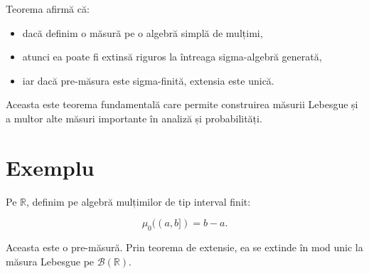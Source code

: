 \documentclass[12pt]{article}
\theoremstyle{plain}
\begin{document}
Teorema afirmă că:

\begin{itemize}
    \item dacă definim o măsură pe o algebră simplă de mulțimi,
    \item atunci ea poate fi extinsă riguros la întreaga sigma-algebră generată,
    \item iar dacă pre-măsura este sigma-finită, extensia este unică.
\end{itemize}

Aceasta este teorema fundamentală care permite construirea măsurii Lebesgue
și a multor alte măsuri importante în analiză și probabilități.

\section{Exemplu}

Pe $\mathbb{R}$, definim pe algebră mulțimilor de tip interval finit:



\[
\mu_0((a,b]) = b - a.
\]



Aceasta este o pre-măsură.  
Prin teorema de extensie, ea se extinde în mod unic la măsura Lebesgue
pe $\mathcal{B}(\mathbb{R})$.
\end{document}
